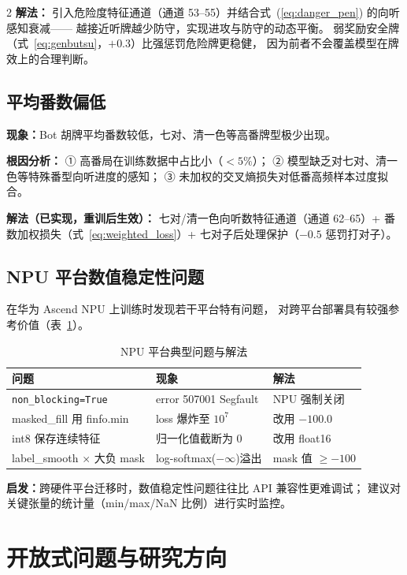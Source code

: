 \documentclass{article}
\begin{document}
\begin{multicols}{2}
\textbf{解法：}
引入危险度特征通道（通道 53--55）并结合式~(\ref{eq:danger_pen}) 的向听感知衰减——
越接近听牌越少防守，实现进攻与防守的动态平衡。
弱奖励安全牌（式~\ref{eq:genbutsu}，$+0.3$）比强惩罚危险牌更稳健，
因为前者不会覆盖模型在牌效上的合理判断。

\subsection{平均番数偏低}

\textbf{现象：}Bot 胡牌平均番数较低，七对、清一色等高番牌型极少出现。

\textbf{根因分析：}
① 高番局在训练数据中占比小（$<5\%$）；
② 模型缺乏对七对、清一色等特殊番型向听进度的感知；
③ 未加权的交叉熵损失对低番高频样本过度拟合。

\textbf{解法（已实现，重训后生效）：}
七对/清一色向听数特征通道（通道 62--65）+
番数加权损失（式~\ref{eq:weighted_loss}）+
七对子后处理保护（$-0.5$ 惩罚打对子）。

\subsection{NPU 平台数值稳定性问题}

在华为 Ascend NPU 上训练时发现若干平台特有问题，
对跨平台部署具有较强参考价值（表~\ref{tab:npu}）。

\begin{table}[H]
\centering
\caption{NPU 平台典型问题与解法}
\label{tab:npu}
\small
\setlength{\tabcolsep}{4pt}
\begin{tabular}{p{2.2cm}p{2.0cm}p{2.2cm}}
\toprule
问题 & 现象 & 解法 \\
\midrule
\texttt{non\_blocking=True} &
  error 507001 Segfault &
  NPU 强制关闭 \\
masked\_fill 用 finfo.min &
  loss 爆炸至 $10^7$ &
  改用 $-100.0$ \\
int8 保存连续特征 &
  归一化值截断为 0 &
  改用 float16 \\
label\_smooth $\times$ 大负 mask &
  log-softmax($-\infty$)溢出 &
  mask 值 $\geq -100$ \\
\bottomrule
\end{tabular}
\end{table}

\textbf{启发：}跨硬件平台迁移时，数值稳定性问题往往比 API 兼容性更难调试；
建议对关键张量的统计量（min/max/NaN 比例）进行实时监控。

\section{开放式问题与研究方向}
\label{sec:open}


\end{multicols}
\end{document}
